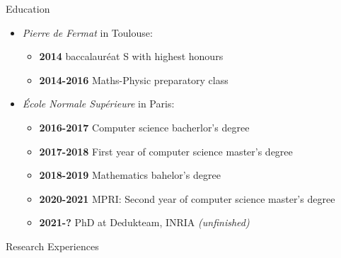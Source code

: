 \documentclass[a4paper,11pt]{extarticle}
\newcommand{\cvtitle}[1]{
    \begin{tcolorbox}[colback=bgcol,colframe=ForestGreen,
        height=1cm, valign=center, sharp corners=downhill]
        {\Large #1}
    \end{tcolorbox}
}
\begin{document}
    \begin{minipage}[c][282mm][t]{0.60\linewidth}

        \cvtitle{Education}

        \begin{itemize}
          \item \emph{Pierre de Fermat} in Toulouse:
                \begin{itemize}
                  \item \textbf{2014} baccalauréat S with highest honours
                  \item \textbf{2014-2016} Maths-Physic preparatory class
                \end{itemize}
          \item \emph{École Normale Supérieure} in Paris:
                \begin{itemize}
                  \item \textbf{2016-2017} Computer science bacherlor's degree
                  \item \textbf{2017-2018} First year of computer science master's degree
                  \item \textbf{2018-2019} Mathematics bahelor's degree
                  \item \textbf{2020-2021} MPRI: Second year of computer science master's degree
                  \item \textbf{2021-?} PhD at Dedukteam, INRIA \emph{(unfinished)}
                \end{itemize}
        \end{itemize}

        \cvtitle{Research Experiences}


\end{minipage}
\end{document}
